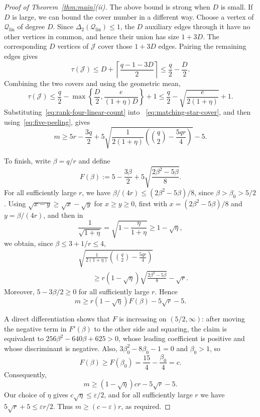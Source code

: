 \documentclass[10pt,a4paper]{amsart}
\newcommand{\DelTwo}{\Delta_2}
\newcommand{\cJ}{\mathcal J}
\newcommand{\cQlin}{\mathcal Q_{\mathrm{lin}}}
\newcommand{\ta}{\tau}
\begin{document}
\begin{proof}[Proof of Theorem~\ref{thm:main}(ii)]
The above bound is strong when $D$ is small.  If $D$ is large, we can bound
the cover number in a different way.  Choose a vertex of $\cQlin$ of degree
$D$.  Since $\DelTwo(\cQlin)\le1$, the $D$ auxiliary edges through it have no
other vertices in common, and hence their union has size $1+3D$.  The
corresponding $D$ vertices of $\cJ$ cover those $1+3D$ edges.  Pairing the
remaining edges gives
\[
  \ta(\cJ)
  \le D+\left\lceil\frac{q-1-3D}{2}\right\rceil
  \le \frac q2-\frac D2.
\]
Combining the two covers and using the geometric mean,
\begin{equation}\label{eq:matching-star-cover}
  \ta(\cJ)
  \le \frac q2-
  \max\left\{\frac D2,\frac{e}{(1+\eta)D}\right\}+1
  \le \frac q2-\sqrt{\frac{e}{2(1+\eta)}}+1.
\end{equation}
Substituting~\eqref{eq:rank-four-linear-count} into
~\eqref{eq:matching-star-cover}, and then using~\eqref{eq:five-peeling},
gives
\[
  m\ge
  5r-\frac{3q}{2}
  +5\sqrt{\frac{1}{2(1+\eta)}
  \left(\binom q2-\frac{5qr}{4}\right)}-5.
\]

To finish, write $\beta=q/r$ and define
\[
  F(\beta):=
  5-\frac{3\beta}{2}
  +5\sqrt{\frac{2\beta^2-5\beta}{8}}.
\]
For all sufficiently large $r$, we have
$\beta/(4r)\le(2\beta^2-5\beta)/8$, since $\beta>\beta_0>5/2$.
Using $\sqrt{x-y}\ge\sqrt{x}-\sqrt y$ for $x\ge y\ge0$, first with
$x=(2\beta^2-5\beta)/8$ and $y=\beta/(4r)$, and then in
\[
  \frac1{\sqrt{1+\eta}}
  =\sqrt{1-\frac{\eta}{1+\eta}}\ge1-\sqrt\eta,
\]
we obtain, since $\beta\le3+1/r\le4$,
\[
\begin{aligned}
  &\sqrt{\frac{1}{2(1+\eta)}
  \left(\binom q2-\frac{5qr}{4}\right)}\\
  &\qquad\ge
  r(1-\sqrt\eta)\sqrt{\frac{2\beta^2-5\beta}{8}}
  -\sqrt r.
\end{aligned}
\]
Moreover, $5-3\beta/2\ge0$ for all sufficiently large $r$.  Hence
\[
  m\ge r(1-\sqrt\eta)F(\beta)-5\sqrt r-5.
\]

A direct differentiation shows that $F$ is increasing on $(5/2,\infty)$:
after moving the negative term in $F'(\beta)$ to the other side and
squaring, the claim is equivalent to
$256\beta^2-640\beta+625>0$, whose leading coefficient is positive and
whose discriminant is negative.  Also,
$3\beta_0^2-8\beta_0-1=0$ and $\beta_0>1$, so
\[
  F(\beta)\ge F(\beta_0)
  =\frac{15}{4}-\frac{\beta_0}{4}=c.
\]
Consequently,
\[
  m\ge (1-\sqrt\eta)cr-5\sqrt r-5.
\]
Our choice of $\eta$ gives $c\sqrt\eta\le\varepsilon/2$, and for all
sufficiently large $r$ we have $5\sqrt r+5\le\varepsilon r/2$.
Thus $m\ge(c-\varepsilon)r$, as required.
\end{proof}
\end{document}
